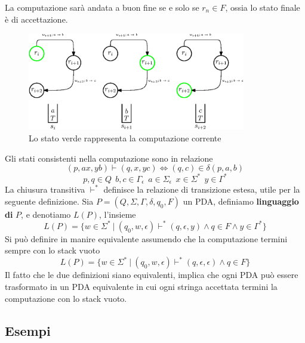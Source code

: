\documentclass[10pt, letterpaper]{report}
\begin{document}
La computazione sarà andata a buon fine se e solo se $r_n\in F$, ossia lo stato finale è di accettazione.\begin{center}
    \begin{figure}[h!]
        \centering 
        \includegraphics[width=0.85\textwidth ]{images/pda1.eps}
        \caption{Lo stato verde rappresenta la computazione corrente}
        \label{fig:pdaComp}
    \end{figure}
\end{center}
Gli stati consistenti nella computazione sono in relazione 
$$ (p,ax,yb)\vdash (q,x,yc)\iff (q,c)\in\delta(p,a,b)$$
$$ p,q\in Q\  \ b,c\in\Gamma_\epsilon\ \ a\in\Sigma_\epsilon\ \ x\in\Sigma^* \ \ y\in\Gamma^*$$
La chiusura transitiva $\vdash^*$ definisce la relazione di transizione estesa, utile per la seguente 
definizione.\acc 
{} Sia $P=(Q,\Sigma,\Gamma,\delta,q_0,F)$ un PDA, definiamo \textbf{linguaggio di }$P$, e denotiamo $L(P)$, 
l'insieme $$L(P)=\{w\in\Sigma^* \ | \ (q_0,w,\epsilon)\vdash^* (q,\epsilon,y) \land q\in F\land y\in\Gamma^*\} $$
Si può definire in manire equivalente assumendo che la computazione termini sempre 
con lo stack vuoto 
$$L(P)=\{w\in\Sigma^* \ | \ (q_0,w,\epsilon)\vdash^* (q,\epsilon,\epsilon) \land q\in F\} $$
Il fatto che le due definizioni siano equivalenti, implica che ogni PDA può essere trasformato in un PDA equivalente 
in cui ogni stringa accettata termini la computazione con lo stack vuoto.
\subsection{Esempi}
\end{document}
